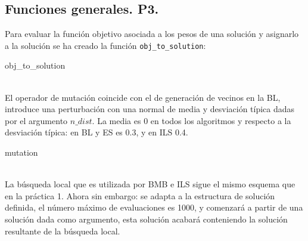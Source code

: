 \documentclass[11pt,a4paper]{article}
\theoremstyle{definition}
\begin{document}
	\subsection{Funciones generales. P3.}
	
	Para evaluar la función objetivo asociada a los pesos de una solución y asignarlo a la solución se ha creado la función \texttt{obj\_to\_solution}:\\
		
		\begin{algorithm}[H]
		\caption{obj\_to\_solution}
	\end{algorithm}~\\
	
	El operador de mutación coincide con el de generación de vecinos en la BL, introduce una perturbación con una normal de media y desviación típica dadas por el argumento $n\_dist$. La media es 0 en todos los algoritmos y respecto a la desviación típica: en BL y ES es 0.3, y en ILS 0.4.  \\
	
	\begin{algorithm}[H]
		\caption{mutation}
	\end{algorithm}~\\
	
		La búsqueda local que es utilizada por BMB e ILS sigue el mismo esquema que en la práctica 1. Ahora sin embargo: se adapta a la estructura de solución definida, el número máximo de evaluaciones es 1000, y comenzará a partir de una solución dada como argumento, esta solución acabará conteniendo la solución resultante de la búsqueda local.\\
		
\end{document}
